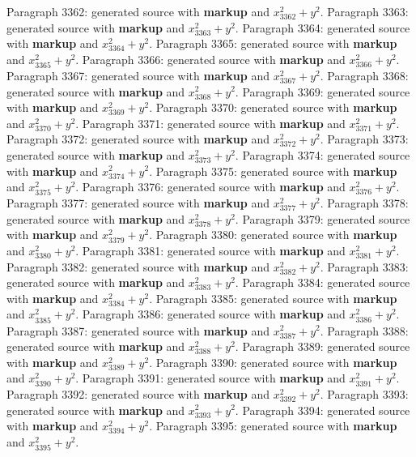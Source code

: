 \documentclass{article}
\begin{document}
Paragraph 3362: generated source with \textbf{markup} and $x_{3362}^2 + y^2$.
Paragraph 3363: generated source with \textbf{markup} and $x_{3363}^2 + y^2$.
Paragraph 3364: generated source with \textbf{markup} and $x_{3364}^2 + y^2$.
Paragraph 3365: generated source with \textbf{markup} and $x_{3365}^2 + y^2$.
Paragraph 3366: generated source with \textbf{markup} and $x_{3366}^2 + y^2$.
Paragraph 3367: generated source with \textbf{markup} and $x_{3367}^2 + y^2$.
Paragraph 3368: generated source with \textbf{markup} and $x_{3368}^2 + y^2$.
Paragraph 3369: generated source with \textbf{markup} and $x_{3369}^2 + y^2$.
Paragraph 3370: generated source with \textbf{markup} and $x_{3370}^2 + y^2$.
Paragraph 3371: generated source with \textbf{markup} and $x_{3371}^2 + y^2$.
Paragraph 3372: generated source with \textbf{markup} and $x_{3372}^2 + y^2$.
Paragraph 3373: generated source with \textbf{markup} and $x_{3373}^2 + y^2$.
Paragraph 3374: generated source with \textbf{markup} and $x_{3374}^2 + y^2$.
Paragraph 3375: generated source with \textbf{markup} and $x_{3375}^2 + y^2$.
Paragraph 3376: generated source with \textbf{markup} and $x_{3376}^2 + y^2$.
Paragraph 3377: generated source with \textbf{markup} and $x_{3377}^2 + y^2$.
Paragraph 3378: generated source with \textbf{markup} and $x_{3378}^2 + y^2$.
Paragraph 3379: generated source with \textbf{markup} and $x_{3379}^2 + y^2$.
Paragraph 3380: generated source with \textbf{markup} and $x_{3380}^2 + y^2$.
Paragraph 3381: generated source with \textbf{markup} and $x_{3381}^2 + y^2$.
Paragraph 3382: generated source with \textbf{markup} and $x_{3382}^2 + y^2$.
Paragraph 3383: generated source with \textbf{markup} and $x_{3383}^2 + y^2$.
Paragraph 3384: generated source with \textbf{markup} and $x_{3384}^2 + y^2$.
Paragraph 3385: generated source with \textbf{markup} and $x_{3385}^2 + y^2$.
Paragraph 3386: generated source with \textbf{markup} and $x_{3386}^2 + y^2$.
Paragraph 3387: generated source with \textbf{markup} and $x_{3387}^2 + y^2$.
Paragraph 3388: generated source with \textbf{markup} and $x_{3388}^2 + y^2$.
Paragraph 3389: generated source with \textbf{markup} and $x_{3389}^2 + y^2$.
Paragraph 3390: generated source with \textbf{markup} and $x_{3390}^2 + y^2$.
Paragraph 3391: generated source with \textbf{markup} and $x_{3391}^2 + y^2$.
Paragraph 3392: generated source with \textbf{markup} and $x_{3392}^2 + y^2$.
Paragraph 3393: generated source with \textbf{markup} and $x_{3393}^2 + y^2$.
Paragraph 3394: generated source with \textbf{markup} and $x_{3394}^2 + y^2$.
Paragraph 3395: generated source with \textbf{markup} and $x_{3395}^2 + y^2$.
\end{document}
